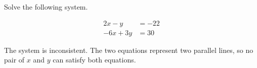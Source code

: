 
\begin{question}
Solve the following system.

\[\begin{aligned}
2 x - y&=-22\\
- 6 x + 3 y&=30
\end{aligned}\]
\end{question}

\begin{solution}
The system is inconsistent. The two equations represent two parallel
lines, so no pair of \(x\) and \(y\) can satisfy both equations.
\end{solution}

